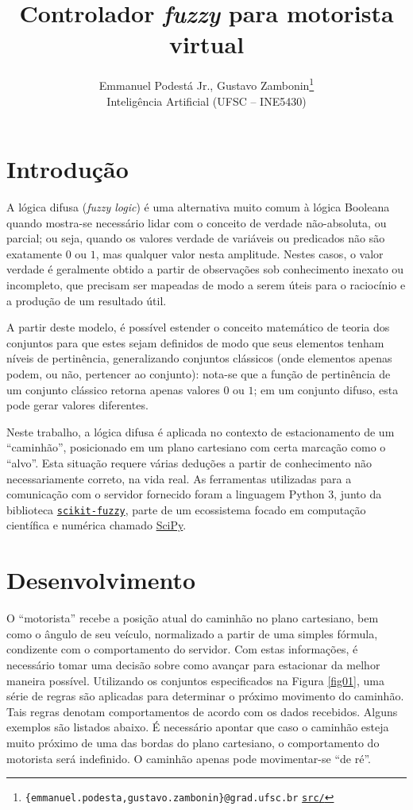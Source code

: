 \documentclass{article}
\title{\textbf{Controlador \emph{fuzzy} para motorista virtual}}
\author{Emmanuel Podestá Jr., Gustavo Zambonin\thanks{
        \texttt{\{emmanuel.podesta,gustavo.zambonin\}@grad.ufsc.br} \hfill
        \texttt{\href{https://github.com/zambonin/ufsc-ine5430}{src/}}
    } \\
    \small{Inteligência Artificial (UFSC -- INE5430)}
}
\date{}
\begin{document}
\maketitle

\section{Introdução}

A lógica difusa (\emph{fuzzy logic}) é uma alternativa muito comum à lógica
Booleana quando mostra-se necessário lidar com o conceito de verdade
não-absoluta, ou parcial; ou seja, quando os valores verdade de variáveis ou
predicados não são exatamente $0$ ou $1$, mas qualquer valor nesta amplitude.
Nestes casos, o valor verdade é geralmente obtido a partir de observações sob
conhecimento inexato ou incompleto, que precisam ser mapeadas de modo a serem
úteis para o raciocínio e a produção de um resultado útil. \medskip

A partir deste modelo, é possível estender o conceito matemático de teoria dos
conjuntos para que estes sejam definidos de modo que seus elementos tenham
níveis de pertinência, generalizando conjuntos clássicos (onde elementos apenas
podem, ou não, pertencer ao conjunto): nota-se que a função de pertinência de
um conjunto clássico retorna apenas valores $0$ ou $1$; em um conjunto difuso,
esta pode gerar valores diferentes. \medskip

Neste trabalho, a lógica difusa é aplicada no contexto de estacionamento de um
``caminhão'', posicionado em um plano cartesiano com certa marcação como o
``alvo''. Esta situação requere várias deduções a partir de conhecimento
não necessariamente correto, na vida real. As ferramentas utilizadas para a
comunicação com o servidor fornecido foram a linguagem Python 3, junto da
biblioteca
\href{https://github.com/scikit-fuzzy/scikit-fuzzy}{\texttt{scikit-fuzzy}},
parte de um ecossistema focado em computação científica e
numérica chamado \href{https://scipy.org}{SciPy}.

\section{Desenvolvimento}

O ``motorista'' recebe a posição atual do caminhão no plano cartesiano, bem
como o ângulo de seu veículo, normalizado a partir de uma simples fórmula,
condizente com o comportamento do servidor. Com estas informações, é
necessário tomar uma decisão sobre como avançar para estacionar da melhor
maneira possível. Utilizando os conjuntos especificados na Figura \ref{fig01},
uma série de regras são aplicadas para determinar o próximo movimento do
caminhão. Tais regras denotam comportamentos de acordo com os dados recebidos.
Alguns exemplos são listados abaixo. É necessário apontar que caso o caminhão
esteja muito próximo de uma das bordas do plano cartesiano, o comportamento do
motorista será indefinido. O caminhão apenas pode movimentar-se ``de ré''.
\end{document}
